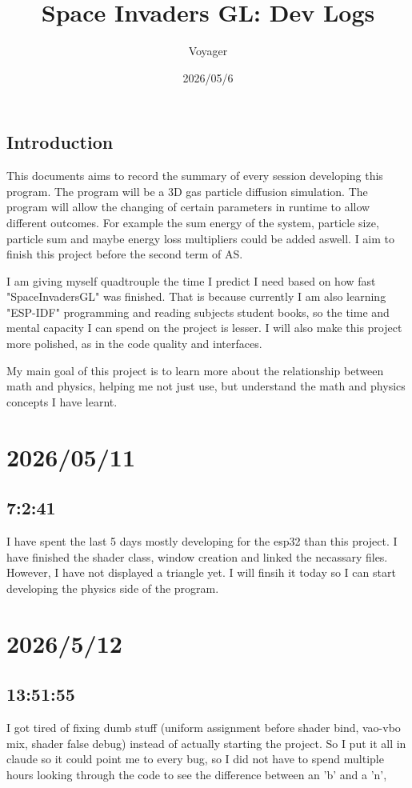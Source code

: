 \documentclass{article}
\title{Space Invaders GL: Dev Logs}
\author{Voyager}
\date{2026/05/6}
\begin{document}
\maketitle
\subsection*{Introduction}
This documents aims to record the summary of every session developing this program. The program will
be a 3D gas particle diffusion simulation. The program will allow the changing of certain parameters
in runtime to allow different outcomes. For example the sum energy of the system, particle size, 
particle sum and maybe energy loss multipliers could be added aswell. I aim to finish this project before
the second term of AS.

I am giving myself quadtrouple the time I predict I need based on how fast "SpaceInvadersGL" was 
finished. That is because currently I am also learning "ESP-IDF" programming and reading subjects student 
books, so the time and mental capacity I can spend on the project is lesser. I will also make this project 
more polished, as in the code quality and interfaces.

My main goal of this project is to learn more about the relationship between math and physics, helping me 
not just use, but understand the math and physics concepts I have learnt.

\section*{2026/05/11}
\subsection*{7:2:41}
I have spent the last 5 days mostly developing for the esp32 than this project. I have finished the
shader class, window creation and linked the necassary files. However, I have not displayed a triangle 
yet. I will finsih it today so I can start developing the physics side of the program.

\section*{2026/5/12}
\subsection*{13:51:55}
I got tired of fixing dumb stuff (uniform assignment before shader bind, vao-vbo mix, shader false debug) 
instead of actually starting the project. So I put it all in claude so it could point me to every bug, so I
did not have to spend multiple hours looking through the code to see the difference between an 'b' and a 'n',
\end{document}
